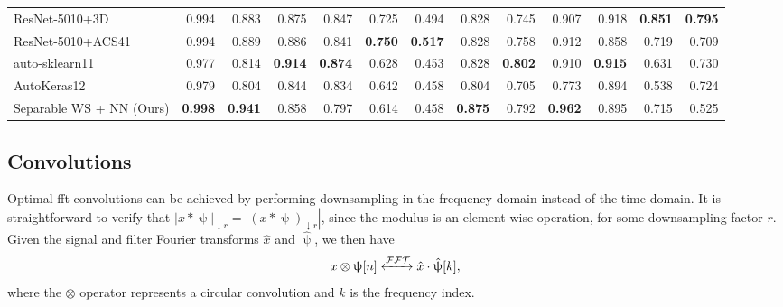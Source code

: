 \begin{table*}[t!]
\begin{tabular}{|l|rr|rr|rr|rr|rr|rr|}
ResNet-5010+3D          & 0.994                   & 0.883                   & 0.875                   & 0.847                   & 0.725                   & 0.494                   & 0.828                   & 0.745                   & 0.907                   & 0.918                   & \textbf{0.851}          & \textbf{0.795}          \\
ResNet-5010+ACS41       & 0.994                   & 0.889                   & 0.886                   & 0.841                   & \textbf{0.750}           & \textbf{0.517}          & 0.828                   & 0.758                   & 0.912                   & 0.858                   & 0.719                   & 0.709                   \\
auto-sklearn11          & 0.977                   & 0.814                   & \textbf{0.914}          & \textbf{0.874}          & 0.628                   & 0.453                   & 0.828                   & \textbf{0.802}          & 0.910                   & \textbf{0.915}          & 0.631                   & 0.730                    \\
AutoKeras12             & 0.979                   & 0.804                   & 0.844                   & 0.834                   & 0.642                   & 0.458                   & 0.804                   & 0.705                   & 0.773                   & 0.894                   & 0.538                   & 0.724                   \\ \hline
Separable WS + NN (Ours)  & \textbf{0.998}          & \textbf{0.941}          & 0.858                   & 0.797                   & 0.614                   & 0.458                   & \textbf{0.875}          & 0.792                   & \textbf{0.962}          & 0.895                   & 0.715                   & 0.525    \\ \hline              
\end{tabular}
\end{table*}

\subsection{Convolutions}
Optimal \ac{fft} convolutions can be achieved by performing downsampling in the frequency domain instead of the time domain. It is straightforward to verify that $|x * \uppsi|_{\downarrow r} = \left|(x * \uppsi)_{\downarrow r}\right|$, since the modulus is an element-wise operation, for some downsampling factor $r$. Given the signal and filter Fourier transforms $\hat{x}$ and $\hat{\uppsi}$, we then have
\begin{equation}
\label{eqn:circconv}
    x \otimes \uppsi [n] \xleftrightarrow{\mathcal{FFT}}  \hat{x} \cdot \hat{\uppsi} [k],
\end{equation}
where the $\otimes$ operator represents a circular convolution and $k$ is the frequency index.

